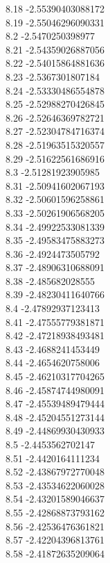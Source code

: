 {8.18	-2.55390403088172\\
8.19	-2.55046296090331\\
8.2	-2.5470250398977\\
8.21	-2.54359026887056\\
8.22	-2.54015864881636\\
8.23	-2.5367301807184\\
8.24	-2.53330486554878\\
8.25	-2.52988270426845\\
8.26	-2.52646369782721\\
8.27	-2.52304784716374\\
8.28	-2.51963515320557\\
8.29	-2.51622561686916\\
8.3	-2.51281923905985\\
8.31	-2.50941602067193\\
8.32	-2.50601596258861\\
8.33	-2.50261906568205\\
8.34	-2.49922533081339\\
8.35	-2.49583475883273\\
8.36	-2.4924473505792\\
8.37	-2.48906310688091\\
8.38	-2.485682028555\\
8.39	-2.48230411640766\\
8.4	-2.47892937123413\\
8.41	-2.47555779381871\\
8.42	-2.47218938493481\\
8.43	-2.4688241453449\\
8.44	-2.4654620758006\\
8.45	-2.46210317704265\\
8.46	-2.45874744980091\\
8.47	-2.45539489479444\\
8.48	-2.45204551273144\\
8.49	-2.44869930430933\\
8.5	-2.4453562702147\\
8.51	-2.4420164111234\\
8.52	-2.43867972770048\\
8.53	-2.43534622060028\\
8.54	-2.43201589046637\\
8.55	-2.42868873793162\\
8.56	-2.42536476361821\\
8.57	-2.42204396813761\\
8.58	-2.41872635209064\\
}
